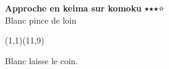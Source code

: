 \documentclass[preview, border=0pt, varwidth=false]{standalone}
\begin{document}
	\setgounit{0.6cm} 
	
\parbox[c][14.65cm][c]{10.2cm}{
	\centering
	
	{\Large\textbf{Approche en keima sur komoku} 	$\medblackstar \medblackstar \medblackstar \medwhitestar$ \\ Blanc pince de loin}
	\vspace{3em}
	
	\begin{psgopartialboard}{(1,1)(11,9)}
		\pass
		\pass*
	\end{psgopartialboard}
	
	\vspace{1em}
	Blanc laisse le coin.
	}
\end{document}
